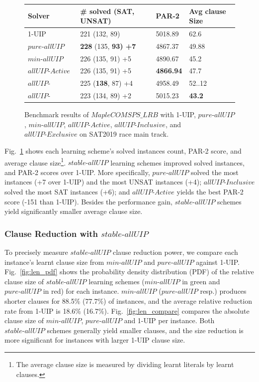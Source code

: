 \documentclass[runningheads]{llncs}
\newcommand{\allUip}{\textit{stable-allUIP}}
\newcommand{\allUipPure}{\textit{pure-allUIP}\xspace}
\newcommand{\allUipMin}{\textit{min-allUIP}\xspace}
\newcommand{\allUipAct}{\textit{allUIP-Active}}
\newcommand{\allUipIn}{\textit{allUIP-Inclusive}}
\newcommand{\allUipEx}{\textit{allUIP-Exclusive}}
\newcommand{\MapleBase}{\textit{MapleCOMSPS\_LRB}}
\begin{document}
\begin{figure} 
\begin{center}
\begin{tabular}{ | m{3.5cm} | m{4cm}| m{2cm} | m{2.75cm} |  } 
\hline
Solver & \# solved (SAT, UNSAT) & PAR-2 & Avg clause Size \\ 
\hline
1-UIP & 221 (132, 89)  & 5018.89 & 62.6  \\ 
\hline
$\allUipPure$ &\textbf{228} (135, \bf{93}) +7 & 4867.37 & 49.88 \\
\hline
$\allUipMin$ & 226 (135, 91) +5 & 4890.67 & 45.2 \\ 
\hline
$\allUipAct$ & 226 (135, 91)  +5 & \textbf{4866.94} & 47.7 \\
\hline
$\allUipIn$ & 225 (\textbf{138}, 87) +4 & 4958.49 & 52..12 \\
\hline
$\allUipEx$ & 223 (134, 89) +2& 5015.23& \textbf{43.2} \\
\hline
\end{tabular}
\end{center}
\caption{Benchmark results of $\MapleBase$ with 1-UIP, $\allUipPure$, $\allUipMin$, $\allUipAct$,
$\allUipIn$, and $\allUipEx$ on SAT2019 race main track.}
\label{fig:t4}
\end{figure}


Fig.~\ref{fig:t4} shows each learning scheme's solved instances count, PAR-2 score, and average clause size\footnote{The average clause size is measured by dividing learnt literals by learnt clauses.}.  $\allUip$ learning schemes improved solved instances, and PAR-2 scores over 1-UIP. More specifically, $\allUipPure$ solved the most instances (+7 over 1-UIP) and the most UNSAT instances (+4);  $\allUipIn$ solved the most SAT instances (+6); and $\allUipAct$ yields the best PAR-2 score (-151 than 1-UIP). Besides the performance gain, $\allUip$ schemes yield significantly smaller average clause size. 

\subsubsection{Clause Reduction with $\allUip$}
To precisely measure $\allUip$ clause reduction power, we compare each instance's learnt clause size from $\allUipMin$ and $\allUipPure$ against 1-UIP. Fig.~\ref{fig:len_pdf} shows the probability density distribution (PDF) of the relative clause size of $\allUip$ learning
schemes ($\allUipMin$ in green and $\allUipPure$ in red) for each instance. $\allUipMin$ ($\allUipPure$ resp.) produces shorter clauses for 88.5\% (77.7\%) of instances, and the average relative reduction rate from 1-UIP is 18.6\% (16.7\%). Fig.~\ref{fig:len_compare} compares the absolute clause size of $\allUipMin$, $\allUipPure$ and 1-UIP per instance.  
Both $\allUip$ schemes generally yield smaller clauses,
and the size reduction is more significant for instances with larger 1-UIP clause size. 
\end{document}
